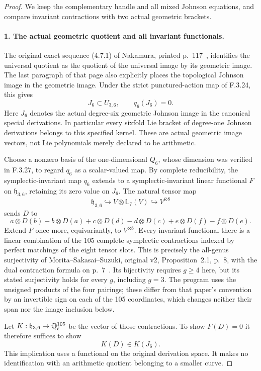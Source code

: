 \begin{proof}
We keep the complementary handle and all mixed Johnson equations, and compare invariant contractions with two actual geometric brackets.
\paragraph{1. The actual geometric quotient and all invariant functionals.}
The original exact sequence (4.7.1) of Nakamura,
printed p.~117~\cite{AuditNakamura1996}, identifies the universal quotient
as the quotient of the universal image by its
geometric image. The last paragraph of that page
also explicitly places the topological Johnson
image in the geometric image. Under the strict
punctured-action map of F.3.24, this gives
\[
                    J_6\subset U_{3,6},\qquad q_6(J_6)=0.
                                                               \tag{PT.2}
\]
Here $J_6$ denotes the actual degree-six geometric
Johnson image in the canonical special derivations.
In particular every sixfold Lie bracket of
degree-one Johnson derivations belongs to this
specified kernel. These are actual geometric
image vectors, not Lie polynomials merely
declared to be arithmetic.

Choose a nonzero basis of the one-dimensional $Q_6$,
whose dimension was verified in F.3.27, to regard $q_6$
as a scalar-valued map. By complete reducibility, the
symplectic-invariant map $q_6$ extends to a symplectic-invariant linear
functional $F$ on $\mathfrak h_{3,6}$, retaining
its zero value on $J_6$. The natural tensor map
\[
 \mathfrak h_{3,6}\hookrightarrow V\otimes\mathbb L_7(V)
                      \hookrightarrow V^{\otimes8}
\]
sends $D$ to
\[
 a\otimes D(b)-b\otimes D(a)
 +c\otimes D(d)-d\otimes D(c)
 +e\otimes D(f)-f\otimes D(e).
\]
Extend $F$ once more, equivariantly, to $V^{\otimes8}$.
Every invariant functional there is a linear
combination of the 105 complete symplectic
contractions indexed by perfect matchings of
the eight tensor slots. This is precisely the
all-genus surjectivity of Morita--Sakasai--Suzuki,
original v2, Proposition~2.1, p.~8, with the
dual contraction formula on p.~7~\cite{AuditMoritaSakasaiSuzuki2015v2}. Its bijectivity
requires $g\geq4$ here, but its stated surjectivity
holds for every $g$, including $g=3$.
The program uses the unsigned products of the
four pairings; these differ from that paper's
convention by an invertible sign on each of
the 105 coordinates, which changes neither
their span nor the image inclusion below.

Let $K:\mathfrak h_{3,6}\to\mathbb Q_\ell^{105}$ be
the vector of those contractions. To show
$F(D)=0$ it therefore suffices to show
\[
                    K(D)\in K(J_6).                       \tag{PT.3}
\]
This implication uses a functional on the original
derivation space. It makes no identification with
an arithmetic quotient belonging to a smaller curve.


\end{proof}
